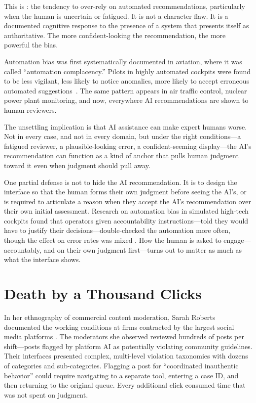 This is : the tendency to over-rely on automated recommendations, particularly when the human is uncertain or fatigued. It is not a character flaw. It is a documented cognitive response to the presence of a system that presents itself as authoritative. The more confident-looking the recommendation, the more powerful the bias.

\begin{cautionbox}
Automation bias was first systematically documented in aviation, where it was called ``automation complacency.'' Pilots in highly automated cockpits were found to be less vigilant, less likely to notice anomalies, more likely to accept erroneous automated suggestions~\autocite{parasuraman2010complacency}. The same pattern appears in air traffic control, nuclear power plant monitoring, and now, everywhere AI recommendations are shown to human reviewers.
\end{cautionbox}

The unsettling implication is that AI assistance can make expert humans worse. Not in every case, and not in every domain, but under the right conditions---a fatigued reviewer, a plausible-looking error, a confident-seeming display---the AI's recommendation can function as a kind of anchor that pulls human judgment toward it even when judgment should pull away.

One partial defense is not to hide the AI recommendation. It is to design the interface so that the human forms their own judgment before seeing the AI's, or is required to articulate a reason when they accept the AI's recommendation over their own initial assessment. Research on automation bias in simulated high-tech cockpits found that operators given accountability instructions---told they would have to justify their decisions---double-checked the automation more often, though the effect on error rates was mixed \autocite{skitka1999automation}. How the human is asked to engage---accountably, and on their own judgment first---turns out to matter as much as what the interface shows.

\section{Death by a Thousand Clicks}
\label{sec:ch6-clicks}

In her ethnography of commercial content moderation, Sarah Roberts documented the working conditions at firms contracted by the largest social media platforms \autocite{roberts2019behind}. The moderators she observed reviewed hundreds of posts per shift---posts flagged by platform AI as potentially violating community guidelines. Their interfaces presented complex, multi-level violation taxonomies with dozens of categories and sub-categories. Flagging a post for ``coordinated inauthentic behavior'' could require navigating to a separate tool, entering a case ID, and then returning to the original queue. Every additional click consumed time that was not spent on judgment.

